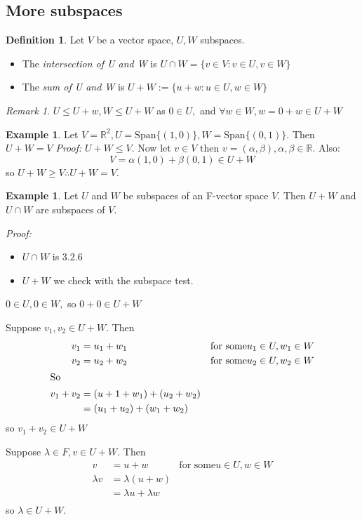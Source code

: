\documentclass{report}
\makeatletter
\theoremstyle{remark}
\newtheorem{remark}[theorem]{Remark}
\theoremstyle{definition}
\newtheorem{definition}[theorem]{Definition}
\theoremstyle{definition}
\newtheorem{example}[theorem]{Example}
\theoremstyle{theorem}
\providecommand{\varitem}{} %
\newenvironment{axioms}[1]
 {\renewcommand\varitem[1]{\item[\textbf{#1\arabic{enumi}\rlap{$##1$}.}]%
    \edef\@currentlabel{#1\arabic{enumi}{$##1$}}}%
  \enumerate[label=\textbf{#1\arabic*.}, ref=#1\arabic*]}
 {\endenumerate}
\makeatother
\begin{document}
\subsection{More subspaces}
\begin{definition}
Let $V$ be a vector space, $U, W$ subspaces.
\begin{itemize}
    \item The \emph{intersection of U and W} is $U \cap W = \{ v \in V: v \in U, v \in W\}$
    \item The \emph{sum of U and W} is $U+W := \{u+w: u \in U, w \in W\}$
\end{itemize}
\end{definition}
\begin{remark}
$U \leq U+w, W \leq U+W$ as $0 \in U,$ and $ \forall w \in W, w = 0+w \in U+W$
\end{remark}
\begin{example}
Let $V=\mathbb{R}^2, U = \text{Span}\{(1,0)\}, W = \text{Span}\{(0,1)\}$. Then $U+W = V$
\emph{Proof:} $U+W \leq V$. Now let $v \in V$ then $v = (\alpha, \beta), \alpha, \beta \in \mathbb{R}$. Also:
\[V = \alpha(1,0) + \beta(0,1) \in U+W\]
so $U+W \geq V \therefore U+W = V$.
\end{example}
\begin{example}
Let $U$ and $W$ be subspaces of an F-vector space $V$. Then $U+W$ and $U \cap W$ are subspaces of $V$.
\end{example}
\emph{Proof:}
\begin{itemize}
    \item $U \cap W$ is 3.2.6
    \item $U + W$ we check with the subspace test.
\end{itemize}
\begin{axioms}{S}
    \item $0 \in U, 0 \in W,$ so $0+0 \in U+W$
    \item Suppose $v_1, v_2 \in U+W.$ Then
    \begin{align*}
        v_1 &= u_1 + w_1 & \text{for some} u_1 \in U, w_1 \in W\\
        v_2 &= u_2 + w_2 & \text{for some} u_2 \in U, w_2 \in W\\
        \intertext{So}
        v_1 + v_2 &= (u+1 + w_1) + (u_2 + w_2)\\
        &= (u_1 + u_2) + (w_1 + w_2)
    \end{align*}
    so $v_1 + v_2 \in U+W$
    \item Suppose $\lambda \in F, v \in U+W$. Then
    \begin{align*}
        v &= u + w & \text{for some} u \in U, w \in W\\
        \lambda v &= \lambda(u+w)\\
        &= \lambda u + \lambda w\\
    \end{align*}
    so $\lambda \in U + W$.
\end{axioms}
\end{document}
